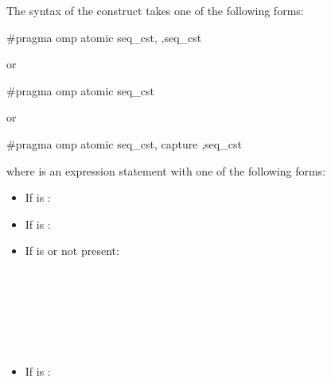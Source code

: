 {{{{\ccppspecificstart
The syntax of the  construct takes one of the following forms:

\begin{boxedcode}
\#pragma omp atomic \plc{[}seq\_cst\plc{[},\plc{]]}  \plc{[[},\plc{]}seq\_cst\plc{]} 
\end{boxedcode}


or

\begin{boxedcode}
\#pragma omp atomic \plc{[}seq\_cst\plc{]}  
\end{boxedcode}

or

\begin{boxedcode}
\#pragma omp atomic \plc{[}seq\_cst\plc{[},\plc{]]} capture \plc{[[},\plc{]}seq\_cst\plc{]} 
\end{boxedcode}

where  is an expression statement with one of the following forms:

\begin{itemize}
\item If  is :\\

\item If  is :\\

\item If  is  or not present:\\
\\
\\
\\
\\
\\
\\

\item If  is :\\
\\
\\
\\
\\
\\
\\


\end{itemize}}}}}
